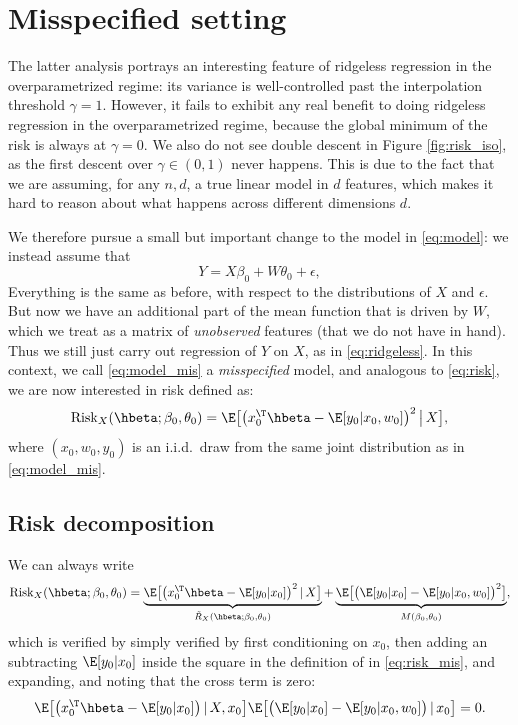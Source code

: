 \documentclass{article}
\begin{document}
\section{Misspecified setting}

The latter analysis portrays an interesting feature of ridgeless regression in  
the overparametrized regime: its variance is well-controlled past the
interpolation threshold $\gamma = 1$. However, it fails to exhibit any real
benefit to doing ridgeless regression in the overparametrized regime, because
the global minimum of the risk is always at $\gamma = 0$. We also do not see
double descent in Figure \ref{fig:risk_iso}, as the first descent over $\gamma
\in (0,1)$ never happens. This is due to the fact that we are assuming, for any 
$n,d$, a true linear model in $d$ features, which makes it hard to reason about
what happens across different dimensions $d$.    

We therefore pursue a small but important change to the model in
\eqref{eq:model}: we instead assume that    
\begin{equation}
\label{eq:model_mis}
Y = X\beta_0 + W\theta_0 + \epsilon,
\end{equation}
Everything is the same as before, with respect to the distributions of $X$ and
$\epsilon$. But now we have an additional part of the mean function that is
driven by $W$, which we treat as a matrix of \emph{unobserved} features (that we 
do not have in hand). Thus we still just carry out regression of $Y$ on $X$, as
in \eqref{eq:ridgeless}. In this context, we call \eqref{eq:model_mis} a
\emph{misspecified} model, and analogous to \eqref{eq:risk}, we are now 
interested in risk defined as:
\begin{equation}
\label{eq:risk_mis}
\Risk_X(\hbeta; \beta_0, \theta_0) = \E \big[ \big( x_0^\T \hbeta -
\E[y_0|x_0,w_0] \big)^2 \,\big|\, X \big],
\end{equation}
where $(x_0,w_0,y_0)$ is an i.i.d.\ draw from the same joint distribution as in 
\eqref{eq:model_mis}. 

\subsection{Risk decomposition} 

We can always write 
\begin{equation}
\label{eq:risk_mis_decomp}
\Risk_X(\hbeta; \beta_0, \theta_0) = 
\underbrace{\E \big[ \big( x_0^\T \hbeta - \E[y_0|x_0] \big)^2 \,|\, X 
  \big]}_{\tilde{R}_X(\hbeta; \beta_0, \theta_0)} +
\underbrace{\E \big[ \big( \E[y_0|x_0] - \E[y_0|x_0,w_0] \big)^2
  \big]}_{M(\beta_0, \theta_0) \vphantom{\tilde{R}_X}}, 
\end{equation}
which is verified by simply verified by first conditioning on $x_0$, then adding
an subtracting $\E[y_0|x_0]$ inside the square in the definition of
 in \eqref{eq:risk_mis}, and
expanding, and noting that the cross term is zero:   
\[
\E \big[ \big( x_0^\T \hbeta - \E[y_0|x_0] \big) \,|\, X,x_0 \big]
\E \big[\big( \E[y_0|x_0] - \E[y_0|x_0,w_0] \big) \,|\, x_0 \big] = 0.
\]
\end{document}
